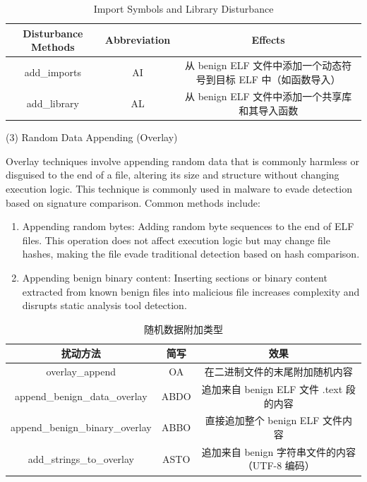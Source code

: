 \begin{table}[htbp]
	\centering
	\caption{Import Symbols and Library Disturbance}\label{tab:4.2}
	\begin{tabular*}{\textwidth}{@{\extracolsep{\fill}}ccc}
		\toprule
		Disturbance Methods & Abbreviation & Effects \\
		\midrule
		add\_imports & AI & 从 benign ELF 文件中添加一个动态符号到目标 ELF 中（如函数导入） \\
		add\_library & AL & 从 benign ELF 文件中添加一个共享库和其导入函数 \\
		\bottomrule
	\end{tabular*}
\end{table}



(3) Random Data Appending (Overlay)

Overlay techniques involve appending random data that is commonly harmless or disguised to the end of a file, altering its size and structure without changing execution logic. This technique is commonly used in malware to evade detection based on signature comparison. Common methods include:
\begin{enumerate}

\item Appending random bytes: Adding random byte sequences to the end of ELF files. This operation does not affect execution logic but may change file hashes, making the file evade traditional detection based on hash comparison.

\item Appending benign binary content: Inserting sections or binary content extracted from known benign files into malicious file increases complexity and disrupts static analysis tool detection.
\end{enumerate}

\begin{table}[htbp]
	\centering
	\caption{随机数据附加类型}\label{tab:4.3}
	\begin{tabular*}{\textwidth}{@{\extracolsep{\fill}}ccc}
		\toprule
		扰动方法 & 简写 & 效果 \\
		\midrule
		overlay\_append & OA & 在二进制文件的末尾附加随机内容 \\
		append\_benign\_data\_overlay & ABDO & 追加来自 benign ELF 文件 .text 段的内容 \\
		append\_benign\_binary\_overlay & ABBO & 直接追加整个 benign ELF 文件内容 \\
		add\_strings\_to\_overlay & ASTO & 追加来自 benign 字符串文件的内容（UTF-8 编码） \\
		\bottomrule
	\end{tabular*}
\end{table}

